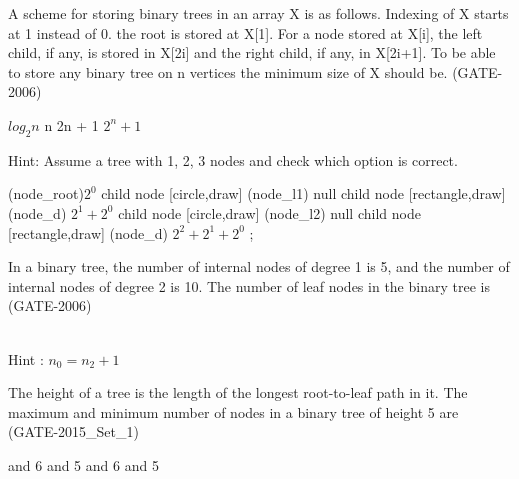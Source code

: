 \begin{questyle}
  \question  A scheme for storing binary trees in an array X is as follows. Indexing of X
            starts at 1 instead of 0. the root is stored at X[1]. For a node stored at X[i], the
            left child, if any, is stored in X[2i] and the right child, if any, in X[2i+1]. To
            be able to store any binary tree on n vertices the minimum size of X should be.  (GATE-2006)

  \begin{oneparchoices}
    \choice         \(log_2n\)
    \choice         n
    \choice         2n + 1
    \CorrectChoice  \(2^n + 1\)
  \end{oneparchoices}

  Hint: Assume a tree with 1, 2, 3 nodes and check which option is correct.

    \begin{myTree}
       (node_root){\(2^0\)}
        child
        {
            node [circle,draw] (node_l1) {null}
        }
        child
        {
            node [rectangle,draw] (node_d){ \(2^1 + 2^0\) }
            child
            {
                node [circle,draw] (node_l2) {null}
            }
            child
            {
                node [rectangle,draw] (node_d){ \(2^2 + 2^1 + 2^0\) }
            }
        };
    \end{myTree}

\end{questyle}

\begin{questyle}
  \question  In a binary tree, the number of internal nodes of degree 1 is 5, and the number of
             internal nodes of degree 2 is 10. The number of leaf nodes in the binary tree is  (GATE-2006)

  \begin{oneparchoices}
  \end{oneparchoices}
   \\ Hint :  \( n_0 =  n_2 + 1 \)
  \end{questyle}

\begin{questyle}
  \question  The height of a tree is the length of the longest root-to-leaf path in it. The
             maximum and minimum number of nodes in a binary tree of height 5 are  (GATE-2015\_Set\_1)

  \begin{oneparchoices}
     and 6
     and 5
     and 6
     and 5
  \end{oneparchoices}
\end{questyle}


